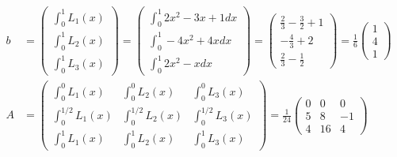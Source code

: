 \begin{solution}
\begin{enumerate}[label = \textbf{\alph*)}]
  \begin{align*}
    b &= \begin{pmatrix}
      \int_0^1 L_1(x) \\ \int_0^1 L_2(x) \\ \int_0^1 L_3(x)
    \end{pmatrix}
    = \begin{pmatrix}
      \int_0^1 2x^2 - 3x + 1 dx \\
      \int_0^1 -4x^2 + 4x dx \\
      \int_0^1 2x^2 - x dx
    \end{pmatrix}
    = \begin{pmatrix}
       \frac{2}{3} - \frac{3}{2} + 1 \\-\frac{4}{3} + 2 \\ \frac{2}{3} - \frac{1}{2}
    \end{pmatrix}
    = \frac{1}{6}\begin{pmatrix}
      1 \\ 4 \\ 1
    \end{pmatrix} \\
    A &= \begin{pmatrix}
      \int_0^0 L_1(x) & \int_0^0 L_2(x) & \int_0^0 L_3(x)\\
      \int_0^{1/2} L_1(x) & \int_0^{1/2} L_2(x) & \int_0^{1/2} L_3(x)\\
      \int_0^1 L_1(x) & \int_0^1 L_2(x) & \int_0^1 L_3(x)
    \end{pmatrix}
    = \frac{1}{24}\begin{pmatrix}
      0 & 0 & 0\\
      5 & 8 & -1\\
      4 & 16 & 4
    \end{pmatrix}
  \end{align*}
\end{enumerate}
\end{solution}
